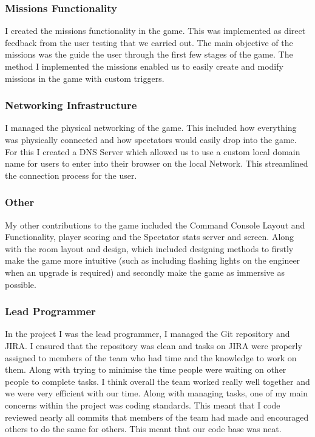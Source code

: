 \documentclass[a4paper,11pt]{article}
\begin{document}
\subsubsection{Missions Functionality}
I created the missions functionality in the game. This was implemented as direct feedback from the user testing that we carried out. The main objective of the missions was the guide the user through the first few stages of the game. The method I implemented the missions enabled us to easily create and modify missions in the game with custom triggers. 

\subsubsection{Networking Infrastructure}
I managed the physical networking of the game. This included how everything was physically connected and how spectators would easily drop into the game. For this I created a DNS Server which allowed us to use a custom local domain name for users to enter into their browser on the local Network. This streamlined the connection process for the user. 
 
\subsubsection{Other}
My other contributions to the game included the Command Console Layout and Functionality, player scoring and the Spectator stats server and screen. Along with the room layout and design, which included designing methods to firstly make the game more intuitive (such as including flashing lights on the engineer when an upgrade is required) and secondly make the game as immersive as possible.


\subsubsection{Lead Programmer}
In the project I was the lead programmer, I managed the Git repository and JIRA. I ensured that the repository was clean and tasks on JIRA were properly assigned to members of the team who had time and the knowledge to work on them. Along with trying to minimise the time people were waiting on other people to complete tasks. I think overall the team worked really well together and we were very efficient with our time.
Along with managing tasks, one of my main concerns within the project was coding standards. This meant that I code reviewed nearly all commits that members of the team had made and encouraged others to do the same for others. This meant that our code base was neat.
\end{document}
